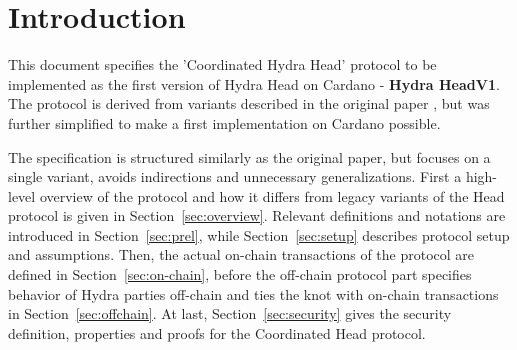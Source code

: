 \section{Introduction}
This document specifies the 'Coordinated Hydra Head' protocol to be implemented as the first version of Hydra Head on Cardano - \textbf{Hydra HeadV1}. The protocol is derived from variants described in the original paper \cite{hydrahead20}, but was further simplified to make a first implementation on Cardano possible.

The specification is structured similarly as the original paper, but focuses on a single variant, avoids indirections and unnecessary generalizations. First a high-level overview of the protocol and how it differs from legacy variants of the Head protocol is given in Section~\ref{sec:overview}. Relevant definitions and notations are introduced in Section~\ref{sec:prel}, while Section~\ref{sec:setup} describes protocol setup and assumptions. Then, the actual on-chain transactions of the protocol are defined in Section~\ref{sec:on-chain}, before the off-chain protocol part specifies behavior of Hydra parties off-chain and ties the knot with on-chain transactions in Section~\ref{sec:offchain}. At last, Section~\ref{sec:security} gives the security definition, properties and proofs for the Coordinated Head protocol.

